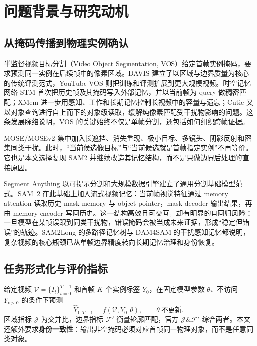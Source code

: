 \documentclass[11pt,a4paper,oneside]{ctexart}
\newcommand{\jf}{\ensuremath{\mathcal{J}\!\&\!\mathcal{F}'}}
\begin{document}
\section{问题背景与研究动机}

\subsection{从掩码传播到物理实例确认}
半监督视频目标分割（Video Object Segmentation, VOS）给定首帧实例掩码，要求预测同一实例在后续帧中的像素区域。DAVIS 建立了以区域与边界质量为核心的传统评测范式，YouTube-VOS 则把训练和评测扩展到更大规模视频\cite{perazzi2016davis,xu2018youtubevos}。时空记忆网络 STM 首次把历史帧及其掩码写入外部记忆，并以当前帧为 query 做稠密匹配\cite{oh2019stm}；XMem 进一步用感知、工作和长期记忆控制长视频中的容量与遗忘\cite{cheng2022xmem}；Cutie 又以对象查询进行自上而下的对象级读取，缓解纯像素匹配受干扰物影响的问题\cite{cheng2024cutie}。这条发展脉络说明，VOS 的关键始终不仅是单帧分割，还包括如何组织跨帧证据。

MOSE/MOSEv2 集中加入长遮挡、消失重现、极小目标、多镜头、阴影反射和密集同类干扰\cite{ding2023mose,ding2025mosev2}。此时，“当前候选像目标”与“当前候选就是首帧指定实例”不再等价。它也是本文选择复现 SAM2 并继续改造其记忆结构，而不是只做边界后处理的直接原因。

Segment Anything 以可提示分割和大规模数据引擎建立了通用分割基础模型范式\cite{kirillov2023sam}。SAM~2 在此基础上加入流式视频记忆：当前帧视觉特征通过 memory attention 读取历史 mask memory 与 object pointer，mask decoder 输出结果，再由 memory encoder 写回历史\cite{ravi2024sam2}。这一结构高效且可交互，却有明显的自回归风险：一旦模型在某帧误跟到同类干扰物，错误掩码会被当成未来证据，形成“稳定但错误”的轨迹。SAM2Long 的多路径记忆树\cite{ding2024sam2long}与 DAM4SAM 的干扰感知记忆\cite{videnovic2024dam4sam}都说明，复杂视频的核心瓶颈已从单帧边界精度转向长期记忆治理和身份恢复。

\subsection{任务形式化与评价指标}
给定视频 $\mathcal V=\{I_t\}_{t=0}^{T-1}$ 和首帧 $K$ 个实例标签 $Y_0$，在固定模型参数 $\theta$、不访问 $Y_{t>0}$ 的条件下预测
\begin{equation}
  \hat Y_{1:T-1}=f(\mathcal V,Y_0;\theta),\qquad \theta\ \text{不更新}.
\end{equation}
区域指标 $\mathcal J$ 为交并比，边界指标 $\mathcal F'$ 衡量轮廓匹配，官方 \jf{} 综合两者。本文还额外要求\textbf{身份一致性}：输出非空掩码必须对应首帧同一物理对象，而不是任意同类对象。
\end{document}
